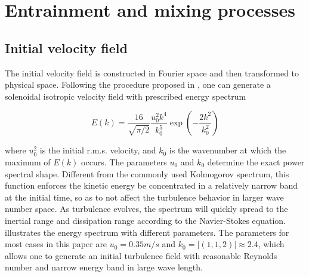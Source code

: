 \section{Entrainment and mixing processes}

\subsection{Initial velocity field}
The initial velocity field is constructed in Fourier space and then transformed
to physical space. Following the procedure proposed in \cite{Rogallo81}, one
can generate a solenoidal isotropic velocity field with prescribed energy
spectrum \cite{Rosales05} 

\begin{equation}
E(k) = \frac{16}{\sqrt{\pi/2}}\frac{u_0^2k^4}{k_0^5}\exp(-\frac{2k^2}{k_0^2})
\end{equation}

where $u_0^2$ is the initial r.m.s. velocity, and $k_0$ is the wavenumber at
which the maximum of $E(k)$ occurs. The parameters $u_0$ and $k_0$ determine
the exact power spectral shape. Different from the commonly used Kolmogorov
spectrum, this function enforces the kinetic energy be concentrated in a
relatively narrow band at the initial time, so as to not affect the turbulence
behavior in larger wave number space. As turbulence evolves, the spectrum will
quickly spread to the inertial range and dissipation range according to the
Navier-Stokes equation.  illustrates the energy spectrum with
different parameters. The parameters for most cases in this paper are $u_0 =
0.35m/s$ and $k_0 = |(1,1,2)| \approx 2.4$, which allows one to generate an
initial turbulence field with reasonable Reynolds number and narrow energy band
in large wave length.

